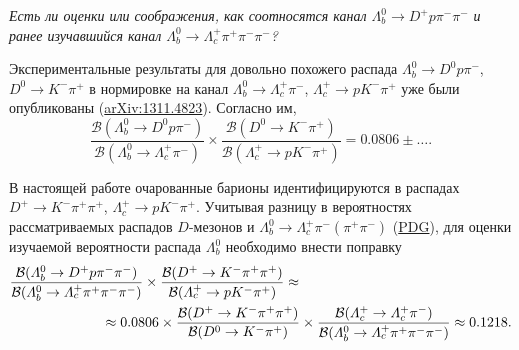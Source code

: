 \documentclass[a4paper, 12pt]{article}
\def\BR{\mathcal{B}}
\def\Lb{\varLambda_b^0}
\def\Lc{\varLambda_c^+}
\def\Dp{D^+}
\def\Km{K^-}
\def\pim{\pi^-}
\def\pip{\pi^+}
\begin{document}
\textit{
	Есть ли оценки или соображения, как соотносятся канал 
	$\Lb\to\Dp p\pim\pim$ 
	и ранее изучавшийся канал 
	$\Lb\to\Lc\pip\pim\pim$?
}

\hspace{\baselineskip}

Экспериментальные результаты для довольно похожего распада 
$\Lb\to D^0 p\pim$, $D^0 \to \Km\pip$ 
в нормировке на канал 
$\Lb\to\Lc\pim$, $\Lc\to p\Km\pip$
уже были опубликованы 
(\href{https://arxiv.org/abs/1311.4823}{arXiv:1311.4823}). 
Согласно им, 
$$ \frac{\BR(\Lb\to D^0p\pim)}{\BR(\Lb\to\Lc\pim)}\times
\frac{\BR(D^0\to\Km\pip)}{\BR(\Lc\to p\Km\pip)} = 0.0806\pm\ldots.$$

В настоящей работе очарованные барионы идентифицируются в распадах 
$\Dp\to \Km\pip\pip$, $\Lc\to p\Km\pip$. Учитывая разницу в вероятностях рассматриваемых распадов $D$-мезонов и $\Lb\to\Lc\pim(\pip\pim)$ (\href{http://pdg.lbl.gov}{PDG}), для оценки изучаемой вероятности распада $\Lb$ необходимо внести поправку
$$
\begin{aligned}
\frac{\BR(\Lb\to\Dp p \pim\pim)}{\BR(\Lb\to\Lc\pip\pim\pim)} 
\times 
\frac{\BR(\Dp\to\Km\pip\pip)}{\BR(\Lc\to p\Km\pip)} 
\approx \text{\hspace*{15em}}
\\ \approx
0.0806\times 
\frac{\BR(\Dp\to\Km\pip\pip)}{\BR(D^0\to\Km\pip)}
\times
\frac{\BR(\Lc\to\Lc\pim)}{\BR(\Lb\to\Lc\pip\pim\pim)}
\approx 0.1218.
\end{aligned}
$$
\end{document}
